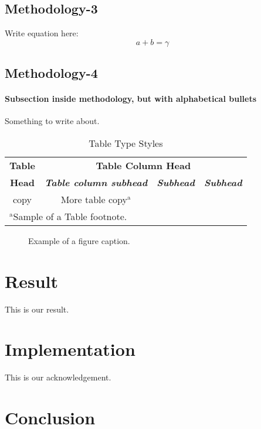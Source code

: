 \documentclass[conference]{IEEEtran}
\begin{document}
\subsection{Methodology-3}
Write equation here:
\begin{equation}
a+b=\gamma\label{eq}
\end{equation}

\subsection{Methodology-4}
\paragraph{Subsection inside methodology, but with alphabetical bullets} Something to write about.
\begin{table}[htbp]
\caption{Table Type Styles}
\begin{center}
\begin{tabular}{|c|c|c|c|}
\hline
\textbf{Table}&\multicolumn{3}{|c|}{\textbf{Table Column Head}} \\
\cline{2-4} 
\textbf{Head} & \textbf{\textit{Table column subhead}}& \textbf{\textit{Subhead}}& \textbf{\textit{Subhead}} \\
\hline
copy& More table copy$^{\mathrm{a}}$& &  \\
\hline
\multicolumn{4}{l}{$^{\mathrm{a}}$Sample of a Table footnote.}
\end{tabular}
\label{tab1}
\end{center}
\end{table}

\begin{figure}[htbp]
\centerline{
}
\caption{Example of a figure caption.}
\label{fig}
\end{figure}

\section*{Result}

This is our result.

\section*{Implementation}

This is our acknowledgement.

\section*{Conclusion}
\end{document}
